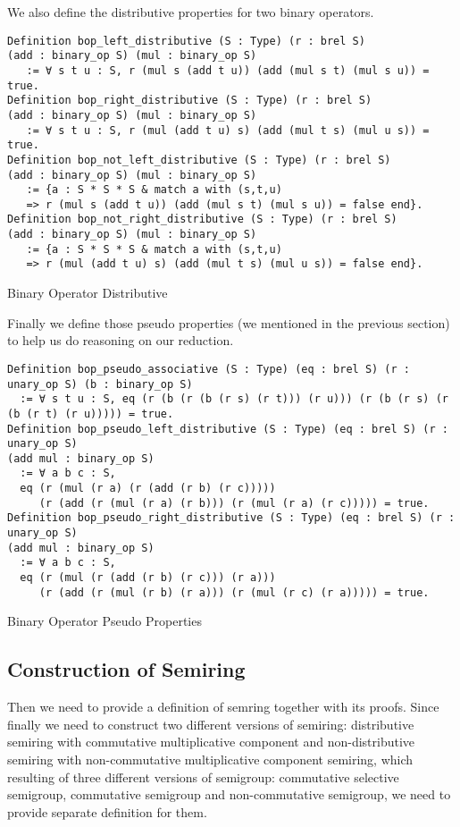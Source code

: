 We also define the distributive properties for two binary operators.
\begin{listing}[H]
\begin{verbatim}
Definition bop_left_distributive (S : Type) (r : brel S) 
(add : binary_op S) (mul : binary_op S) 
   := ∀ s t u : S, r (mul s (add t u)) (add (mul s t) (mul s u)) = true. 
Definition bop_right_distributive (S : Type) (r : brel S) 
(add : binary_op S) (mul : binary_op S) 
   := ∀ s t u : S, r (mul (add t u) s) (add (mul t s) (mul u s)) = true. 
Definition bop_not_left_distributive (S : Type) (r : brel S) 
(add : binary_op S) (mul : binary_op S) 
   := {a : S * S * S & match a with (s,t,u) 
   => r (mul s (add t u)) (add (mul s t) (mul s u)) = false end}. 
Definition bop_not_right_distributive (S : Type) (r : brel S) 
(add : binary_op S) (mul : binary_op S) 
   := {a : S * S * S & match a with (s,t,u) 
   => r (mul (add t u) s) (add (mul t s) (mul u s)) = false end}.
\end{verbatim}
\caption{Binary Operator Distributive} 
\label{coq:def:binary_properties_distributive}
\end{listing}

Finally we define those pseudo properties (we mentioned in the previous section) to help us do reasoning on our reduction.

\begin{listing}[H]
\begin{verbatim}
Definition bop_pseudo_associative (S : Type) (eq : brel S) (r : unary_op S) (b : binary_op S) 
  := ∀ s t u : S, eq (r (b (r (b (r s) (r t))) (r u))) (r (b (r s) (r (b (r t) (r u))))) = true.
Definition bop_pseudo_left_distributive (S : Type) (eq : brel S) (r : unary_op S) 
(add mul : binary_op S) 
  := ∀ a b c : S, 
  eq (r (mul (r a) (r (add (r b) (r c))))) 
     (r (add (r (mul (r a) (r b))) (r (mul (r a) (r c))))) = true.          
Definition bop_pseudo_right_distributive (S : Type) (eq : brel S) (r : unary_op S) 
(add mul : binary_op S) 
  := ∀ a b c : S, 
  eq (r (mul (r (add (r b) (r c))) (r a))) 
     (r (add (r (mul (r b) (r a))) (r (mul (r c) (r a))))) = true.

\end{verbatim}
\caption{Binary Operator Pseudo Properties} 
\label{coq:def:binary_properties_pseudo}
\end{listing}

\subsection{Construction of Semiring}
Then we need to provide a definition of semring together with its proofs. Since finally we need to construct two different versions of semiring: distributive semiring with commutative multiplicative component and non-distributive semiring with non-commutative multiplicative component semiring, which resulting of three different versions of semigroup: commutative selective semigroup, commutative semigroup and non-commutative semigroup, we need to provide separate definition for them.


